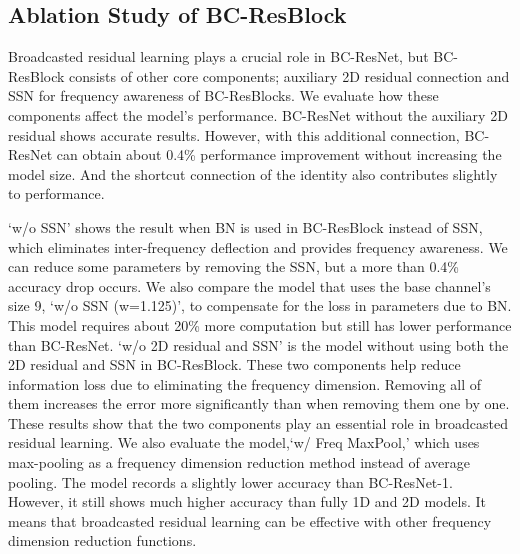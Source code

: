 \documentclass[a4paper]{article}
\begin{document}
\subsection{Ablation Study of BC-ResBlock}
Broadcasted residual learning plays a crucial role in BC-ResNet, but BC-ResBlock consists of other core components; auxiliary 2D residual connection and SSN for frequency awareness of BC-ResBlocks.
We evaluate how these components affect the model's performance.
BC-ResNet without the auxiliary 2D residual shows accurate results.
However, with
this additional connection, BC-ResNet can obtain about 0.4\% performance improvement without increasing the model size. And the shortcut connection of the identity also contributes slightly to performance.

`w/o SSN' shows the result when BN is used in BC-ResBlock instead of SSN, which eliminates inter-frequency deflection and provides frequency awareness. We can reduce some parameters by removing the SSN, but a more than 0.4\% accuracy drop occurs. We also compare the model that uses the base channel's size 9, `w/o SSN (w=1.125)', to compensate for the loss in parameters due to BN. This model requires about 20\% more computation but still has lower performance than BC-ResNet. \nocite{chang2018broadcasting} 
`w/o 2D residual and SSN' is the model without using both the 2D residual and SSN in BC-ResBlock. These two components help reduce information loss due to eliminating the frequency dimension. Removing all of them increases the error more significantly than when removing them one by one. These results show that the two components play an essential role in broadcasted residual learning.
We also evaluate the model,`w/ Freq MaxPool,' which uses max-pooling as a frequency dimension reduction method instead of average pooling. The model records a slightly lower accuracy than BC-ResNet-1. However, it still shows much higher accuracy than fully 1D and 2D models. It means that broadcasted residual learning can be effective with other frequency dimension reduction functions.
\end{document}
